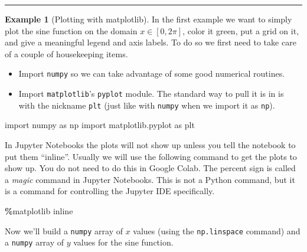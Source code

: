 \documentclass[
]{book}
\newenvironment{Shaded}{\begin{snugshade}}{\end{snugshade}}
\newcommand{\ImportTok}[1]{#1}
\newcommand{\NormalTok}[1]{#1}
\newcommand{\OperatorTok}[1]{\textcolor[rgb]{0.81,0.36,0.00}{\textbf{#1}}}
\providecommand{\tightlist}{%
  \setlength{\itemsep}{0pt}\setlength{\parskip}{0pt}}
\theoremstyle{definition}
\theoremstyle{definition}
\newtheorem{example}{Example}[chapter]
\theoremstyle{definition}
\theoremstyle{remark}
\begin{document}
\begin{center}\rule{0.5\linewidth}{0.5pt}\end{center}

\begin{example}[Plotting with matplotlib]
\protect\hypertarget{exm:unnamed-chunk-749}{}{\label{exm:unnamed-chunk-749} {} }In the first example we want to simply plot the sine function on the domain \(x \in [0,2\pi]\), color it green, put a grid on it, and give a meaningful legend and axis labels. To do so we first need to take care of a couple of housekeeping items.

\begin{itemize}
\tightlist
\item
  Import \texttt{numpy} so we can take advantage of some good numerical routines.
\item
  Import \texttt{matplotlib}'s \texttt{pyplot} module. The standard way to pull it is in is with the nickname \texttt{plt} (just like with \texttt{numpy} when we import it as \texttt{np}).
\end{itemize}
\end{example}

\begin{Shaded}
\begin{Highlighting}[]
\ImportTok{import}\NormalTok{ numpy }\ImportTok{as}\NormalTok{ np }
\ImportTok{import}\NormalTok{ matplotlib.pyplot }\ImportTok{as}\NormalTok{ plt}
\end{Highlighting}
\end{Shaded}

In Jupyter Notebooks the plots will not show up unless you tell the notebook to put them ``inline''. Usually we will use the following command to get the plots to show up. You do not need to do this in Google Colab. The percent sign is called a \emph{magic} command in Jupyter Notebooks. This is not a Python command, but it is a command for controlling the Jupyter IDE specifically.

\begin{Shaded}
\begin{Highlighting}[]
\OperatorTok{\%}\NormalTok{matplotlib inline}
\end{Highlighting}
\end{Shaded}

Now we'll build a \texttt{numpy} array of \(x\) values (using the \texttt{np.linspace} command) and a \texttt{numpy} array of \(y\) values for the sine function.
\end{document}
